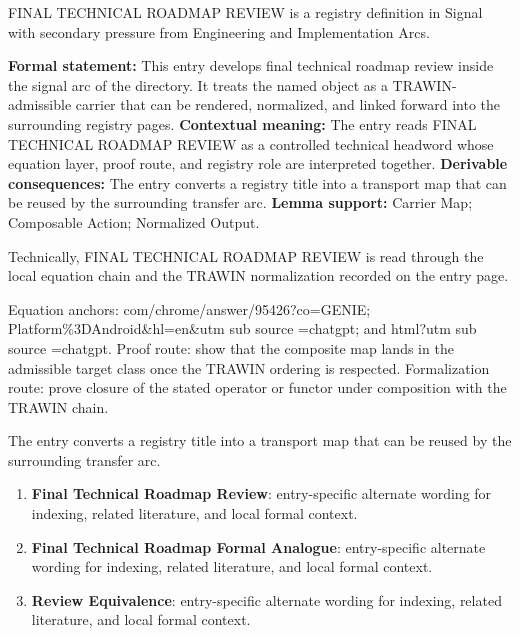 
\begingroup\small
{}
FINAL TECHNICAL ROADMAP REVIEW is a registry definition in Signal with secondary pressure from Engineering and Implementation Arcs.

\begingroup\footnotesize\setlength{\emergencystretch}{3em}\sloppy
\textbf{Formal statement:} This entry develops final technical roadmap review inside the signal arc of the directory. It treats the named object as a TRAWIN-admissible carrier that can be rendered, normalized, and linked forward into the surrounding registry pages. \textbf{Contextual meaning:} The entry reads FINAL TECHNICAL ROADMAP REVIEW as a controlled technical headword whose equation layer, proof route, and registry role are interpreted together. \textbf{Derivable consequences:} The entry converts a registry title into a transport map that can be reused by the surrounding transfer arc. \textbf{Lemma support:} Carrier Map; Composable Action; Normalized Output.\par
\endgroup

Technically, FINAL TECHNICAL ROADMAP REVIEW is read through the local equation chain and the TRAWIN normalization recorded on the entry page.

Equation anchors: com/chrome/answer/95426?co=GENIE; Platform\%3DAndroid\&hl=en\&utm sub source =chatgpt; and html?utm sub source =chatgpt. Proof route: show that the composite map lands in the admissible target class once the TRAWIN ordering is respected. Formalization route: prove closure of the stated operator or functor under composition with the TRAWIN chain.

The entry converts a registry title into a transport map that can be reused by the surrounding transfer arc.
\endgroup

\begin{enumerate}[leftmargin=1.6em,itemsep=6pt,topsep=4pt]
\item \textbf{Final Technical Roadmap Review}: entry-specific alternate wording for indexing, related literature, and local formal context.
\item \textbf{Final Technical Roadmap Formal Analogue}: entry-specific alternate wording for indexing, related literature, and local formal context.
\item \textbf{Review Equivalence}: entry-specific alternate wording for indexing, related literature, and local formal context.
\end{enumerate}

